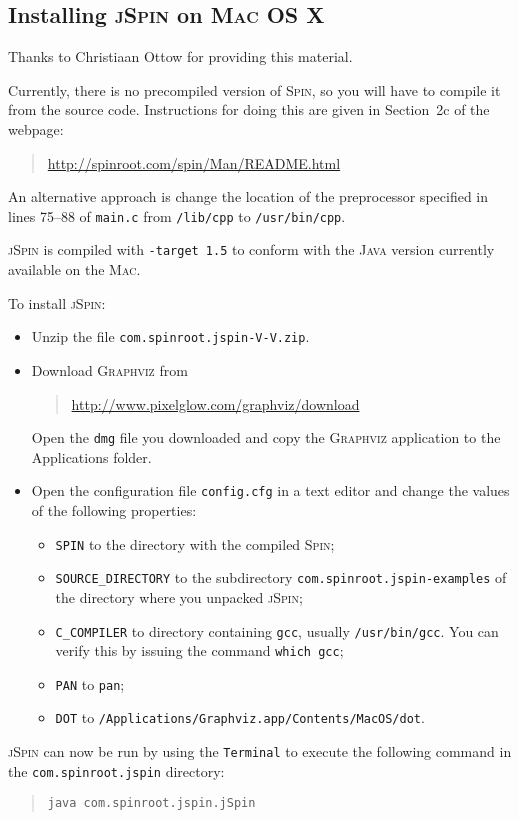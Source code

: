 \documentclass[11pt]{article}
\newcommand{\spn}{\textsc{Spin}}
\newcommand{\js}{\textsc{jSpin}}
\newcommand{\p}[1]{\texttt{#1}}
\begin{document}
\subsection{Installing \js{} on \textsc{Mac OS X}}\label{a.mac}

Thanks to Christiaan Ottow for providing this material.

Currently, there is no precompiled version of \spn{}, so you will have to
compile it from the source code. Instructions for doing this are given
in Section~2c of the webpage:
\begin{quote}
\url{http://spinroot.com/spin/Man/README.html}
\end{quote}
An alternative approach is change the location of the preprocessor specified in 
lines 75--88 of \p{main.c} from \p{/lib/cpp} to \p{/usr/bin/cpp}.

\js{} is compiled with \p{-target 1.5} to conform with the \textsc{Java}
version currently available on the \textsc{Mac}.

To install \js{}:
\begin{itemize}
\item Unzip the file \p{com.spinroot.jspin-V-V.zip}.
\item Download \textsc{Graphviz} from
\begin{quote}
\url{http://www.pixelglow.com/graphviz/download}
\end{quote}
Open the \p{dmg} file you downloaded and copy the \textsc{Graphviz}
application to the Applications folder.
\item Open the configuration file \p{config.cfg} in a text editor and change the
values of the following properties: 
\begin{itemize}
\item \p{SPIN} to the directory with the compiled \spn{};
\item \p{SOURCE\_DIRECTORY} to the subdirectory \p{com.spinroot.jspin-examples} of the directory
where you unpacked \js{};
\item \p{C\_COMPILER} to directory containing \p{gcc},
usually \p{/usr/bin/gcc}. You can verify this by issuing the command \p{which gcc};
\item \p{PAN} to \p{pan};
\item \p{DOT} to \p{/Applications/Graphviz.app/Contents/MacOS/dot}.
\end{itemize}
\end{itemize}

\js{} can now be run by using the \p{Terminal} to execute the following command
in the \p{com.spinroot.jspin} directory:
\begin{quote}
\p{java com.spinroot.jspin.jSpin}
\end{quote}
\end{document}
